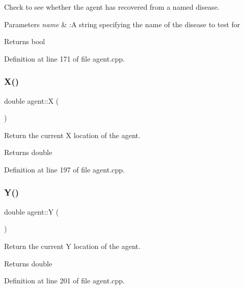 Check to see whether the agent has recovered from a named disease. 


\begin{DoxyParams}{Parameters}
{\em name} & \+:A string specifying the name of the disease to test for\\
\hline
\end{DoxyParams}
\begin{DoxyReturn}{Returns}
bool 
\end{DoxyReturn}


Definition at line 171 of file agent.\+cpp.

\mbox{\label{classagent_a312bd1aeb3c660f43bb3bf5a8f0764e7}} 
\subsubsection{\texorpdfstring{X()}{X()}}
{\footnotesize\ttfamily double agent\+::X (\begin{DoxyParamCaption}{ }\end{DoxyParamCaption})}



Return the current X location of the agent. 

\begin{DoxyReturn}{Returns}
double 
\end{DoxyReturn}


Definition at line 197 of file agent.\+cpp.

\mbox{\label{classagent_a56b8ea7b9138c5e4b92530d454e247ad}} 
\subsubsection{\texorpdfstring{Y()}{Y()}}
{\footnotesize\ttfamily double agent\+::Y (\begin{DoxyParamCaption}{ }\end{DoxyParamCaption})}



Return the current Y location of the agent. 

\begin{DoxyReturn}{Returns}
double 
\end{DoxyReturn}


Definition at line 201 of file agent.\+cpp.



